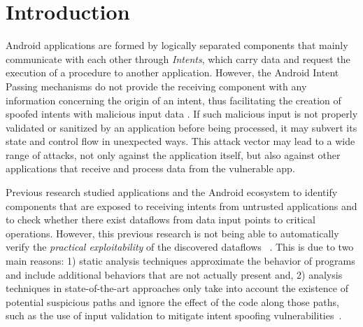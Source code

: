 \section{Introduction}


Android applications are formed by logically separated
components that mainly communicate with each other through \emph{Intents}, which
carry data and request the execution of a procedure to another application.
However, the Android Intent Passing mechanisms do not provide the
receiving component with any information concerning the origin of an intent, thus
facilitating the creation of spoofed intents with malicious input data 
\cite{chin2011analyzing,Lu:CHEX:2012}. If such
malicious input is not properly validated or sanitized by an application
before being processed, it may subvert its state and control flow in unexpected
ways. This attack vector may lead to a wide range of attacks, not only against
the application itself, but also against other applications that receive and
process data from the vulnerable app. 

Previous research studied applications and the Android ecosystem to
identify components that are exposed to receiving intents from untrusted
applications and to check whether there exist dataflows from data input points to critical operations. However, this previous research is not being able to automatically verify the \emph{practical exploitability} of the discovered dataflows ~\cite{Lu:CHEX:2012}. This is due to two main reasons: 1) static analysis techniques approximate the behavior of programs and include additional behaviors that are not actually present and, 2) analysis techniques in state-of-the-art approaches only take into account the existence of potential suspicious paths and ignore the effect of the code along those paths, such as the use of input validation to mitigate intent spoofing vulnerabilities~\cite{chin2011analyzing}. 

